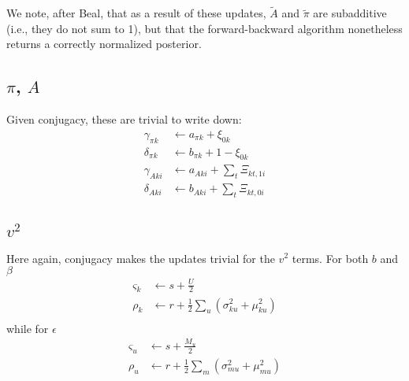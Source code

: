 \documentclass[11pt]{article}
\begin{document}
We note, after Beal, that as a result of these updates, $\tilde{A}$ and $\tilde{\pi}$ are subadditive (i.e., they do not sum to 1), but that the forward-backward algorithm nonetheless returns a correctly normalized posterior.

\subsection{$\pi$, $A$}
Given conjugacy, these are trivial to write down:
\begin{align}
    \gamma_{\pi k} &\leftarrow a_{\pi k} + \xi_{0k} \\
    \delta_{\pi k} &\leftarrow b_{\pi k} + 1 - \xi_{0k} \\
    \gamma_{A ki} &\leftarrow a_{A ki} + \sum_t \Xi_{kt, 1i} \\
    \delta_{A ki} &\leftarrow b_{A ki} + \sum_t \Xi_{kt, 0i} 
\end{align}

\subsection{$v^2$}
Here again, conjugacy makes the updates trivial for the $v^2$ terms. For both $b$ and $\beta$
\begin{align}
    \varsigma_k &\leftarrow s + \frac{U}{2} \\
    \rho_k &\leftarrow r + \frac{1}{2}\sum_u (\sigma^2_{ku} + \mu^2_{ku}) \\
\end{align}
while for $\epsilon$
\begin{align}
    \varsigma_u &\leftarrow s + \frac{M_u}{2} \\
    \rho_u &\leftarrow r + \frac{1}{2} \sum_m (\sigma^2_{mu} + \mu^2_{mu})
\end{align}
\end{document}
